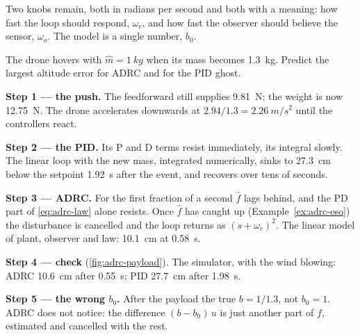 Two knobs remain, both in radians per second and both with a meaning: how fast the loop should respond, $\omega_c$, and how fast the observer should believe the sensor, $\omega_o$. The model is a single number, $b_0$.

\begin{example}
\label{ex:adrc-payload}
The drone hovers with $\hat m = \SI{1}{kg}$ when its mass becomes \SI{1.3}{kg}. Predict the largest altitude error for ADRC and for the PID ghost.

\textbf{Step 1 — the push.} The feedforward still supplies \SI{9.81}{N}; the weight is now \SI{12.75}{N}. The drone accelerates downwards at $2.94/1.3 = \SI{2.26}{m/s^2}$ until the controllers react.

\textbf{Step 2 — the PID.} Its P and D terms resist immediately, its integral slowly. The linear loop with the new mass, integrated numerically, sinks to \SI{27.3}{cm} below the setpoint \SI{1.92}{s} after the event, and recovers over tens of seconds.

\textbf{Step 3 — ADRC.} For the first fraction of a second $\hat f$ lags behind, and the PD part of \cref{eq:adrc-law} alone resists. Once $\hat f$ has caught up (Example~\ref{ex:adrc-eso}) the disturbance is cancelled and the loop returns as $(s + \omega_c)^2$. The linear model of plant, observer and law: \SI{10.1}{cm} at \SI{0.58}{s}.

\textbf{Step 4 — check} (\cref{fig:adrc-payload}). The simulator, with the wind blowing: ADRC \SI{10.6}{cm} after \SI{0.55}{s}; PID \SI{27.7}{cm} after \SI{1.98}{s}.

\textbf{Step 5 — the wrong $b_0$.} After the payload the true $b = 1/1.3$, not $b_0 = 1$. ADRC does not notice: the difference $(b - b_0)\,u$ is just another part of $f$, estimated and cancelled with the rest.
\end{example}



